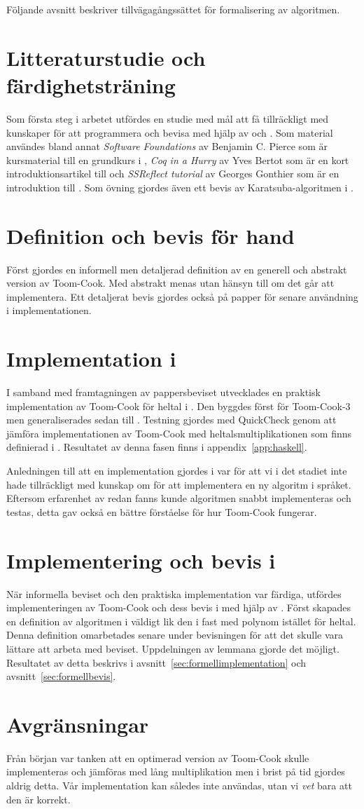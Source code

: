 Följande avsnitt beskriver tillvägagångssättet för formalisering av algoritmen.

\section{Litteraturstudie och färdighetsträning}
Som första steg i arbetet utfördes en studie med mål att få tillräckligt med
kunskaper för att programmera och bevisa med hjälp av \coq{} och \ssr{}. Som
material användes bland annat \emph{Software Foundations} av Benjamin C. Pierce
som är kursmaterial till en grundkurs i \coq{}, \emph{Coq in a Hurry} av Yves
Bertot som är en kort introduktionsartikel till \coq{} och \emph{SSReflect
tutorial} av Georges Gonthier som är en introduktion till \ssr{}. Som övning
gjordes även ett bevis av Karatsuba-algoritmen i \coq{}.

\section{Definition och bevis för hand}
Först gjordes en informell men detaljerad definition av en generell och
abstrakt version av Toom-Cook. Med abstrakt menas utan hänsyn till om det går
att implementera. Ett detaljerat bevis gjordes också på papper för senare
användning i implementationen.

\section{Implementation i \haskell{}}
I samband med framtagningen av pappersbeviset utvecklades en praktisk
implementation av Toom-Cook för heltal i \haskell{}. Den byggdes först för
Toom-Cook-3 men generaliserades sedan till . Testning gjordes med
QuickCheck genom att jämföra implementationen av Toom-Cook med
heltalsmultiplikationen som finns definierad i \haskell{}. Resultatet av denna
fasen finns i appendix~\ref{app:haskell}.

Anledningen till att en implementation gjordes i \haskell{} var för att vi i det
stadiet inte hade tillräckligt med kunskap om \coq{} för att implementera en ny
algoritm i språket. Eftersom erfarenhet av \haskell{} redan fanns kunde algoritmen
snabbt implementeras och testas, detta gav också en bättre förståelse för hur
Toom-Cook fungerar.

\section{Implementering och bevis i \coq{}}
När informella beviset och den praktiska implementation var färdiga, utfördes
implementeringen av Toom-Cook och dess bevis i \coq{} med hjälp av \ssr{}.
Först skapades en definition av algoritmen i \coq{} väldigt lik den i
\haskell{} fast med polynom istället för heltal. Denna definition omarbetades
senare under bevisningen för att det skulle vara lättare att arbeta med
beviset. Uppdelningen av lemmana gjorde det möjligt. Resultatet av detta
beskrivs i avsnitt~\ref{sec:formellimplementation} och
avsnitt~\ref{sec:formellbevis}.

\section{Avgränsningar}
Från början var tanken att en optimerad version av Toom-Cook skulle
implementeras och jämföras med lång multiplikation men i brist på tid gjordes
aldrig detta. Vår implementation kan således inte användas, utan vi \emph{vet}
bara att den är korrekt.

